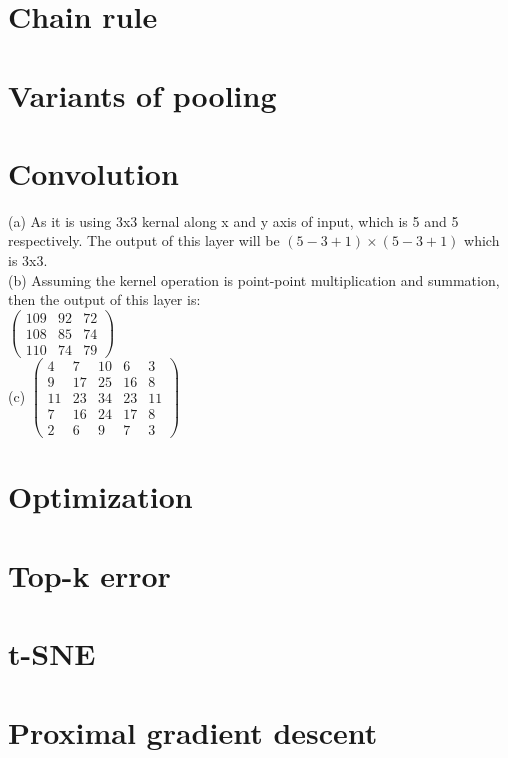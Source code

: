 \documentclass{article}
\begin{document}
\section{Chain rule}
\section{Variants of pooling}
\section{Convolution}
(a) As it is using 3x3 kernal along x and y axis of input, which is 5 and 5 respectively. The output of this layer will be $(5-3+1)\times(5-3+1)$ which is 3x3.\\
(b) Assuming the kernel operation is point-point multiplication and summation, then the output of this layer is:\\
$\begin{pmatrix}
  109 & 92 & 72 \\[0.4em]
  108 & 85 & 74 \\[0.4em]
  110 & 74 & 79
\end{pmatrix}$ \\
(c)
$\begin{pmatrix}
  4 & 7 & 10 & 6 & 3 \\[0.4em]
  9 & 17 & 25 & 16 & 8 \\[0.4em]
  11 & 23 & 34 & 23 & 11 \\[0.4em]
  7 & 16 & 24 & 17 & 8 \\[0.4em]
  2 & 6 & 9 &7 & 3
\end{pmatrix}$ \\


\section{Optimization}
\section{Top-k error}
\section{t-SNE}
\section{Proximal gradient descent}
\end{document}
